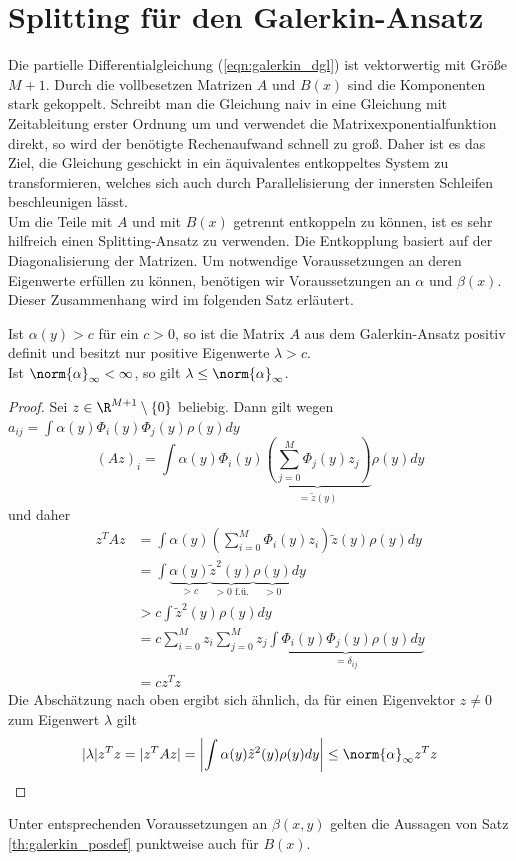 \section{Splitting für den Galerkin-Ansatz}
Die partielle Differentialgleichung (\ref{eqn:galerkin_dgl}) ist vektorwertig mit Größe $M+1$. Durch die vollbesetzen Matrizen $A$ und $B(x)$ sind die Komponenten stark gekoppelt. Schreibt man die Gleichung naiv in eine Gleichung mit Zeitableitung erster Ordnung um und verwendet die Matrixexponentialfunktion direkt, so wird der benötigte Rechenaufwand schnell zu groß. Daher ist es das Ziel, die Gleichung geschickt in ein äquivalentes entkoppeltes System zu transformieren, welches sich auch durch Parallelisierung der innersten Schleifen beschleunigen lässt.\\
Um die Teile mit $A$ und mit $B(x)$ getrennt entkoppeln zu können, ist es sehr hilfreich einen Splitting-Ansatz zu verwenden. Die Entkopplung basiert auf der Diagonalisierung der Matrizen. Um notwendige Voraussetzungen an deren Eigenwerte erfüllen zu können, benötigen wir Voraussetzungen an $\alpha$ und $\beta(x)$. Dieser Zusammenhang wird im folgenden Satz erläutert.
\begin{maththeorem}
\label{th:galerkin_posdef}
Ist $\alpha(y)>c$ für ein $c>0$, so ist die Matrix $A$ aus dem Galerkin-Ansatz positiv definit und besitzt nur positive Eigenwerte $\lambda>c$.\\
Ist $\norm{\alpha}_\infty < \infty$, so gilt $\lambda\le \norm{\alpha}_\infty$.
\end{maththeorem}
\begin{proof}
Sei $z\in\R^{M+1}\setminus \lbrace 0\rbrace$ beliebig. Dann gilt wegen $a_{ij}=\int \alpha(y)\Phi_i(y)\Phi_j(y)\rho(y)dy$
\[(Az)_i=\int \alpha(y)\Phi_i(y)\underbrace{\left(\sum_{j=0}^M\Phi_j(y)z_j\right)}_{=\tilde{z}(y)}\rho(y)dy\]
und daher
\begin{align*}
z^TAz&=\int \alpha(y)\left(\sum_{i=0}^M\Phi_i(y)z_i\right)\tilde{z}(y)\rho(y)dy\\
&=\int\underbrace{\alpha(y)}_{>c}\underbrace{\tilde{z}^2(y)}_{>0 \text{ f.ü.}}\underbrace{\rho(y)}_{>0}dy\\
&>c\int \tilde{z}^2(y)\rho(y)dy\\
&=c\sum_{i=0}^Mz_i\sum_{j=0}^Mz_j\underbrace{\int \Phi_i(y)\Phi_j(y)\rho(y)dy}_{=\delta_{ij}}\\
&=cz^Tz
\end{align*}
Die Abschätzung nach oben ergibt sich ähnlich, da für einen Eigenvektor $z\neq 0$ zum Eigenwert $\lambda$ gilt
\[|\lambda| z^Tz=|z^TAz|=\left|\int \alpha(y)\tilde{z}^2(y)\rho(y)dy\right|\leq \norm{\alpha}_\infty z^Tz\]
\end{proof}
Unter entsprechenden Voraussetzungen an $\beta(x,y)$ gelten die Aussagen von Satz \ref{th:galerkin_posdef} punktweise auch für $B(x)$.
